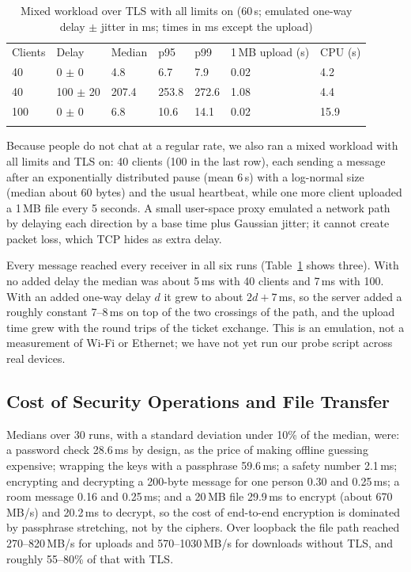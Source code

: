 \documentclass[graybox]{svmult}
\begin{document}
\begin{table}[!tb]
\caption{Mixed workload over TLS with all limits on (60\,s; emulated one-way delay $\pm$ jitter in ms; times in ms except the upload)}
\label{tab:workload}
\footnotesize
\setlength{\tabcolsep}{3pt}
\begin{tabular}{p{1.3cm}p{1.8cm}p{1.2cm}p{1.2cm}p{1.2cm}p{2.0cm}p{1.2cm}}
\svhline\noalign{\smallskip}
Clients & Delay & Median & p95 & p99 & 1\,MB upload (s) & CPU (s) \\
\noalign{\smallskip}\svhline\noalign{\smallskip}
40 & 0 $\pm$ 0 & 4.8 & 6.7 & 7.9 & 0.02 & 4.2 \\
40 & 100 $\pm$ 20 & 207.4 & 253.8 & 272.6 & 1.08 & 4.4 \\
100 & 0 $\pm$ 0 & 6.8 & 10.6 & 14.1 & 0.02 & 15.9 \\
\noalign{\smallskip}\svhline\noalign{\smallskip}
\end{tabular}
\end{table}
Because people do not chat at a regular rate, we also ran a mixed workload with all limits and TLS on: 40 clients (100 in the last row), each sending a message after an exponentially distributed pause (mean 6\,s) with a log-normal size (median about 60 bytes) and the usual heartbeat, while one more client uploaded a 1\,MB file every 5 seconds. A small user-space proxy emulated a network path by delaying each direction by a base time plus Gaussian jitter; it cannot create packet loss, which TCP hides as extra delay.


Every message reached every receiver in all six runs (Table~\ref{tab:workload} shows three). With no added delay the median was about 5\,ms with 40 clients and 7\,ms with 100. With an added one-way delay $d$ it grew to about $2d+7$\,ms, so the server added a roughly constant 7--8\,ms on top of the two crossings of the path, and the upload time grew with the round trips of the ticket exchange. This is an emulation, not a measurement of Wi-Fi or Ethernet; we have not yet run our probe script across real devices.

\subsection{Cost of Security Operations and File Transfer}
Medians over 30 runs, with a standard deviation under 10\% of the median, were: a password check 28.6\,ms by design, as the price of making offline guessing expensive; wrapping the keys with a passphrase 59.6\,ms; a safety number 2.1\,ms; encrypting and decrypting a 200-byte message for one person 0.30 and 0.25\,ms; a room message 0.16 and 0.25\,ms; and a 20\,MB file 29.9\,ms to encrypt (about 670\,MB/s) and 20.2\,ms to decrypt, so the cost of end-to-end encryption is dominated by passphrase stretching, not by the ciphers. Over loopback the file path reached 270--820\,MB/s for uploads and 570--1030\,MB/s for downloads without TLS, and roughly 55--80\% of that with TLS.
\end{document}

